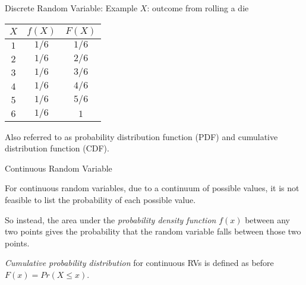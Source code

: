 \documentclass{./../div_teaching_slides}
\begin{document}
\begin{frame}{Discrete Random Variable: Example}
$X$: outcome from rolling a die	\\
\begin{center}
	\begin{tabular}{ccc}
$X$ & $f(X)$ & $F(X)$ \\
\hline
$1$ & $1/6$ & $1/6$\\
$2$ & $1/6$ & $2/6$ \\
$3$ & $1/6$ & $3/6$ \\
$4$ & $1/6$ & $4/6$ \\
$5$ & $1/6$ & $5/6$ \\
$6$ & $1/6$ & $1$\\
\end{tabular}
\end{center}
\vspace{0.5em}

Also referred to as probability distribution function (PDF) and cumulative distribution function (CDF).
\end{frame}

%

\begin{frame}{Continuous Random Variable}
\begin{witemize}
\item For continuous random variables, due to a continuum of possible values, it is not feasible to list the probability of each possible value.
\item So instead, the area under the \textit{probability density function} $f(x)$ between any two points gives the probability that the random variable falls between those two points.
\item \textit{Cumulative probability distribution} for continuous RVs is defined as before $F(x) = Pr(X \leq x)$.
\end{witemize}
\end{frame}
\end{document}
